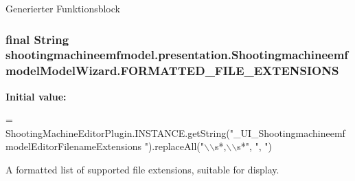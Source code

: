 Generierter Funktionsblock \hypertarget{classshootingmachineemfmodel_1_1presentation_1_1_shootingmachineemfmodel_model_wizard_acb643f573820d5b9e7d7594ada3562cd}{
\subsubsection[{F\-O\-R\-M\-A\-T\-T\-E\-D\-\_\-\-F\-I\-L\-E\-\_\-\-E\-X\-T\-E\-N\-S\-I\-O\-N\-S}]{\setlength{\rightskip}{0pt plus 5cm}final String shootingmachineemfmodel.\-presentation.\-Shootingmachineemfmodel\-Model\-Wizard.\-F\-O\-R\-M\-A\-T\-T\-E\-D\-\_\-\-F\-I\-L\-E\-\_\-\-E\-X\-T\-E\-N\-S\-I\-O\-N\-S\hspace{0.3cm}{\ttfamily [static]}}}\label{classshootingmachineemfmodel_1_1presentation_1_1_shootingmachineemfmodel_model_wizard_acb643f573820d5b9e7d7594ada3562cd}
{\bfseries Initial value\-:}
\begin{DoxyCode}
=
        ShootingMachineEditorPlugin.INSTANCE.getString(\textcolor{stringliteral}{"\_UI\_ShootingmachineemfmodelEditorFilenameExtensions
      "}).replaceAll(\textcolor{stringliteral}{"\(\backslash\)\(\backslash\)s*,\(\backslash\)\(\backslash\)s*"}, \textcolor{stringliteral}{", "})
\end{DoxyCode}
A formatted list of supported file extensions, suitable for display.

